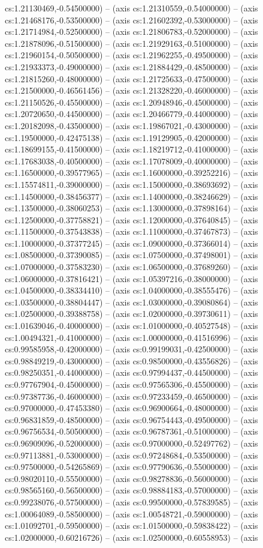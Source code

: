 cs:1.21130469,-0.54500000) -- (axis cs:1.21310559,-0.54000000) -- (axis cs:1.21468176,-0.53500000) -- (axis cs:1.21602392,-0.53000000) -- (axis cs:1.21714984,-0.52500000) -- (axis cs:1.21806783,-0.52000000) -- (axis cs:1.21878096,-0.51500000) -- (axis cs:1.21929163,-0.51000000) -- (axis cs:1.21960154,-0.50500000) -- (axis cs:1.21962255,-0.49500000) -- (axis cs:1.21933373,-0.49000000) -- (axis cs:1.21884429,-0.48500000) -- (axis cs:1.21815260,-0.48000000) -- (axis cs:1.21725633,-0.47500000) -- (axis cs:1.21500000,-0.46561456) -- (axis cs:1.21328220,-0.46000000) -- (axis cs:1.21150526,-0.45500000) -- (axis cs:1.20948946,-0.45000000) -- (axis cs:1.20720650,-0.44500000) -- (axis cs:1.20466779,-0.44000000) -- (axis cs:1.20182098,-0.43500000) -- (axis cs:1.19867021,-0.43000000) -- (axis cs:1.19500000,-0.42475138) -- (axis cs:1.19129905,-0.42000000) -- (axis cs:1.18699155,-0.41500000) -- (axis cs:1.18219712,-0.41000000) -- (axis cs:1.17683038,-0.40500000) -- (axis cs:1.17078009,-0.40000000) -- (axis cs:1.16500000,-0.39577965) -- (axis cs:1.16000000,-0.39252216) -- (axis cs:1.15574811,-0.39000000) -- (axis cs:1.15000000,-0.38693692) -- (axis cs:1.14500000,-0.38456377) -- (axis cs:1.14000000,-0.38246629) -- (axis cs:1.13500000,-0.38060253) -- (axis cs:1.13000000,-0.37898164) -- (axis cs:1.12500000,-0.37758821) -- (axis cs:1.12000000,-0.37640845) -- (axis cs:1.11500000,-0.37543838) -- (axis cs:1.11000000,-0.37467873) -- (axis cs:1.10000000,-0.37377245) -- (axis cs:1.09000000,-0.37366014) -- (axis cs:1.08500000,-0.37390085) -- (axis cs:1.07500000,-0.37498001) -- (axis cs:1.07000000,-0.37583230) -- (axis cs:1.06500000,-0.37689260) -- (axis cs:1.06000000,-0.37816421) -- (axis cs:1.05397216,-0.38000000) -- (axis cs:1.04500000,-0.38334410) -- (axis cs:1.04000000,-0.38555476) -- (axis cs:1.03500000,-0.38804447) -- (axis cs:1.03000000,-0.39080864) -- (axis cs:1.02500000,-0.39388758) -- (axis cs:1.02000000,-0.39730611) -- (axis cs:1.01639046,-0.40000000) -- (axis cs:1.01000000,-0.40527548) -- (axis cs:1.00494321,-0.41000000) -- (axis cs:1.00000000,-0.41516996) -- (axis cs:0.99585958,-0.42000000) -- (axis cs:0.99199031,-0.42500000) -- (axis cs:0.98849219,-0.43000000) -- (axis cs:0.98500000,-0.43556826) -- (axis cs:0.98250351,-0.44000000) -- (axis cs:0.97994437,-0.44500000) -- (axis cs:0.97767904,-0.45000000) -- (axis cs:0.97565306,-0.45500000) -- (axis cs:0.97387736,-0.46000000) -- (axis cs:0.97233459,-0.46500000) -- (axis cs:0.97000000,-0.47453380) -- (axis cs:0.96900664,-0.48000000) -- (axis cs:0.96831859,-0.48500000) -- (axis cs:0.96754443,-0.49500000) -- (axis cs:0.96756534,-0.50500000) -- (axis cs:0.96787361,-0.51000000) -- (axis cs:0.96909096,-0.52000000) -- (axis cs:0.97000000,-0.52497762) -- (axis cs:0.97113881,-0.53000000) -- (axis cs:0.97248684,-0.53500000) -- (axis cs:0.97500000,-0.54265869) -- (axis cs:0.97790636,-0.55000000) -- (axis cs:0.98020110,-0.55500000) -- (axis cs:0.98278836,-0.56000000) -- (axis cs:0.98565160,-0.56500000) -- (axis cs:0.98884183,-0.57000000) -- (axis cs:0.99238076,-0.57500000) -- (axis cs:0.99500000,-0.57839585) -- (axis cs:1.00064089,-0.58500000) -- (axis cs:1.00548721,-0.59000000) -- (axis cs:1.01092701,-0.59500000) -- (axis cs:1.01500000,-0.59838422) -- (axis cs:1.02000000,-0.60216726) -- (axis cs:1.02500000,-0.60558953) -- (axis 